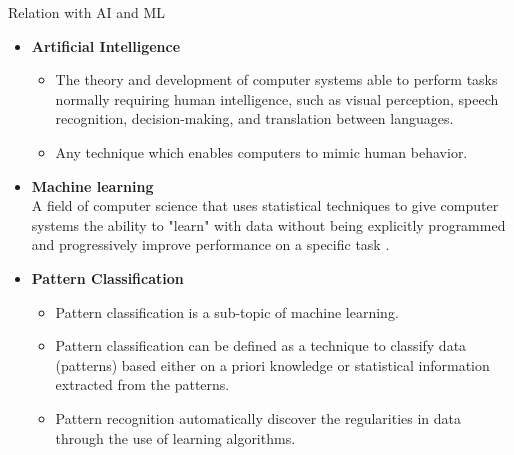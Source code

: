 \begin{frame}{Relation with AI and ML}
\begin{footnotesize}
\begin{itemize}
\item \textbf{\color{mycolor1}Artificial Intelligence}\\
\begin{itemize}
\item The {\color{mycolor2}theory and development of computer systems} able to perform tasks normally requiring {\color{mycolor4}human intelligence}, such as visual perception, speech recognition, decision-making, and translation between languages.  
\item {\color{mycolor2}Any technique which enables computers to mimic human behavior.} 
\end{itemize}
\item \textbf{\color{mycolor1}Machine learning} \\A field of computer science that uses statistical techniques to give computer systems {\color{mycolor4}the ability to "learn"} with data {\color{mycolor4}without being explicitly programmed} and {\color{mycolor2}progressively improve performance} on a specific task .
\item \textbf{\color{mycolor1}Pattern Classification}\\
\begin{itemize}
\item Pattern classification is a sub-topic of machine learning.
\item Pattern classification can be defined as a {\color{mycolor2}technique to classify data} (patterns) based either on a {\color{mycolor2}priori knowledge} or {\color{mycolor4}statistical information} extracted from the patterns.
\item Pattern recognition {\color{mycolor2}automatically discover the regularities} in data through the use of learning algorithms.
\end{itemize}
\end{itemize}
\end{footnotesize}
\end{frame}

